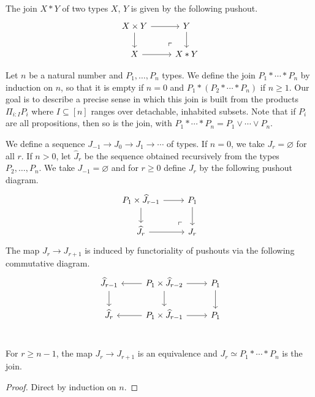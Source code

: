 \begin{definition}
The join $X * Y$ of two types $X$, $Y$ is given by the following pushout.
\[
\begin{tikzcd}
X \times Y \arrow[r] \arrow[d]
	& Y \arrow[d] \\
	X \arrow[r] &
	X * Y 
	\arrow[ul, phantom, "\ulcorner" , very near start]
\end{tikzcd}
\]
\end{definition}

Let $n$ be a natural number and $P_1, \ldots, P_n$ types.
We define the join $P_1 * \cdots * P_n$ by induction on $n$,
so that it is empty if $n = 0$ 
and $P_1 * (P_2 * \cdots * P_n)$ if $n \ge 1$.
Our goal is to describe a precise sense in which
this join is built from the products
$\Pi_{i : I} P_i$ where $I \subseteq [n]$ ranges over detachable,
inhabited subsets.
Note that if $P_i$ are all propositions, then so is the join, with
$P_1 * \cdots * P_n = P_1 \vee \cdots \vee P_n$.

\begin{definition}
We define a sequence $J_{-1} \to J_0 \to J_1 \to \cdots$ of types.
If $n = 0$, we take $J_r = \varnothing$ for all $r$.
If $n > 0$, let $\widehat J_r$ be the sequence obtained recursively from
the types $P_2, \ldots, P_n$.
We take $J_{-1} = \varnothing$ and for $r \ge 0$ define $J_r$ by the following
pushout diagram.
\[
\begin{tikzcd}
P_1 \times \widehat J_{r-1} \arrow[r] \arrow[d]
	& P_1 \arrow[d] \\
	\widehat J_r \arrow[r] &
	J_r 
	\arrow[ul, phantom, "\ulcorner" , very near start]
\end{tikzcd}
\]
The map $J_r \to J_{r+1}$ is induced by functoriality of pushouts via the following
commutative diagram.
\[
\begin{tikzcd}
	\widehat J_{r-1} \arrow[d] &
	P_1 \times \widehat J_{r-2} \arrow[l] \arrow[d] \arrow[r] &
	P_1 \arrow[d] \\
	\widehat J_r &
	P_1 \times \widehat J_{r-1} \arrow[l] \arrow[r] &
	P_1 \\
\end{tikzcd}
\]
\end{definition}

\begin{lemma}\label{eventually-join}
For $r \ge n-1$, the map $J_r \to J_{r+1}$ is an equivalence and
$J_r \simeq P_1 * \cdots * P_n$ is the join.
\end{lemma}
\begin{proof}
Direct by induction on $n$.
\end{proof}

